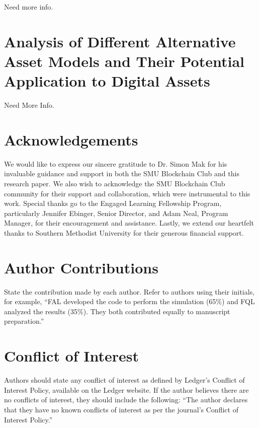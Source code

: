 \documentclass{ledger}
\begin{document}
Need more info.

\section{Analysis of Different Alternative Asset Models and Their Potential Application to Digital Assets}

Need More Info.

\ledgernotes

\section*{Acknowledgements} 

We would like to express our sincere gratitude to Dr. Simon Mak for his invaluable guidance and support in both the SMU Blockchain Club and this research paper. We also wish to acknowledge the SMU Blockchain Club community for their support and collaboration, which were instrumental to this work. Special thanks go to the Engaged Learning Fellowship Program, particularly Jennifer Ebinger, Senior Director, and Adam Neal, Program Manager, for their encouragement and assistance. Lastly, we extend our heartfelt thanks to Southern Methodist University for their generous financial support.

\section*{Author Contributions}

State the contribution made by each author.  Refer to authors using their initials, for example, ``FAL developed the code to perform the simulation (65\%) and FQL analyzed the results (35\%).  They both contributed equally to manuscript preparation.''

\section*{Conflict of Interest}

Authors should state any conflict of interest as defined by Ledger's Conflict of Interest Policy, available on the Ledger website. If the author believes there are no conflicts of interest, they should include the following: ``The author declares that they have no known conflicts of interest as per the journal’s Conflict of Interest Policy.''

\end{document}
